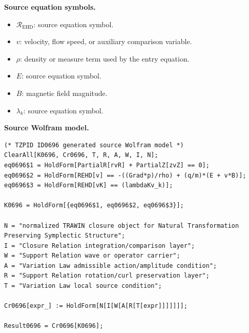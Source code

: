 \begin{minipage}[t]{0.49\linewidth}
\begingroup
\small
\raggedright
\textbf{Source equation symbols.}\par
\begin{itemize}[leftmargin=1.35em,itemsep=1pt,topsep=1pt,parsep=0pt]
    \item $\mathcal{R}_{\mathrm{EHD}}$: source equation symbol.
    \item $v$: velocity, flow speed, or auxiliary comparison variable.
    \item $\rho$: density or measure term used by the entry equation.
    \item $E$: source equation symbol.
    \item $B$: magnetic field magnitude.
    \item $\lambda_k$: source equation symbol.
\end{itemize}
\endgroup
\end{minipage}\hfill
\begin{minipage}[t]{0.47\linewidth}
\begingroup
\scriptsize
\raggedright
\textbf{Source Wolfram model.}\par
\begin{Verbatim}[fontsize=\tiny,breaklines=true,breakanywhere=true]
(* TZPID ID0696 generated source Wolfram model *)
ClearAll[K0696, Cr0696, T, R, A, W, I, N];
eq0696$1 = HoldForm[PartialR[rvR] + PartialZ[zvZ] == 0];
eq0696$2 = HoldForm[REHD[v] == -((Grad*p)/rho) + (q/m)*(E + v*B)];
eq0696$3 = HoldForm[REHD[vK] == (lambdaKv_k)];

K0696 = HoldForm[{eq0696$1, eq0696$2, eq0696$3}];

N = "normalized TRAWIN closure object for Natural Transformation Preserving Symplectic Structure";
I = "Closure Relation integration/comparison layer";
W = "Support Relation wave or operator carrier";
A = "Variation Law admissible action/amplitude condition";
R = "Support Relation rotation/curl preservation layer";
T = "Variation Law local source condition";

Cr0696[expr_] := HoldForm[N[I[W[A[R[T[expr]]]]]]];

Result0696 = Cr0696[K0696];
\end{Verbatim}
\endgroup
\end{minipage}


